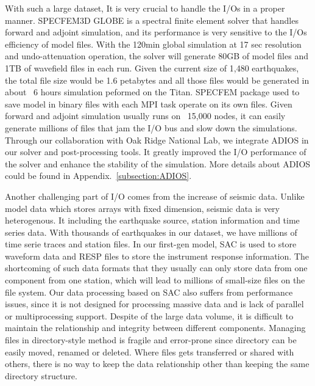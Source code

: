 With such a large dataset, It is very crucial to handle the
I/Os in a proper manner. 
SPECFEM3D GLOBE is a spectral finite element solver that handles forward
and adjoint simulation, and its performance is very
sensitive to the I/Os efficiency of model files.
With the 120min global simulation at 17 sec resolution and
undo-attenuation operation, the solver will generate 80GB of model files
and 1TB of wavefield files in each run.
Given the current size of 1,480 earthquakes, the total file size would be 1.6 petabytes
 and all those files would be generated in about ~6 hours simulation peformed on the
 Titan.
SPECFEM package used to save model in binary files with each
MPI task operate on its own files.
Given forward and adjoint simulation usually runs on ~15,000 nodes,
it can easily generate millions of files that
jam the I/O bus and slow down the simulations.
Through our collaboration with Oak Ridge National Lab,
we integrate ADIOS in our solver and post-processing tools.
It greatly improved the I/O performance of the solver and enhance the stability of the
simulation. More details about ADIOS could be found in Appendix.~\ref{subsection:ADIOS}.

Another challenging part of I/O comes from the increase of seismic data.
Unlike model data which stores arrays with fixed dimension,
seismic data is very heterogenous. It including the earthquake source,
station information and time series data.
With thousands of earthquakes in our dataset, we have millions
of time serie traces and station files.
In our first-gen model, SAC is used to store waveform data and RESP files to store the instrument
response information. The shortcoming of such data formats that they usually can only store 
data from one component from one station, which will lead to millions of small-size files on
the file system.
Our data processing based on SAC also suffers from performance issues, since it is
not designed for processing massive data and is lack of parallel
or multiprocessing support.
Despite of the large data volume,
it is difficult to maintain the relationship and integrity between
different components. Managing files in directory-style method is fragile and
error-prone since directory
can be easily moved, renamed or deleted.
Where files gets transferred or shared with others, there is no way to keep the
data relationship other than keeping the same directory structure.

